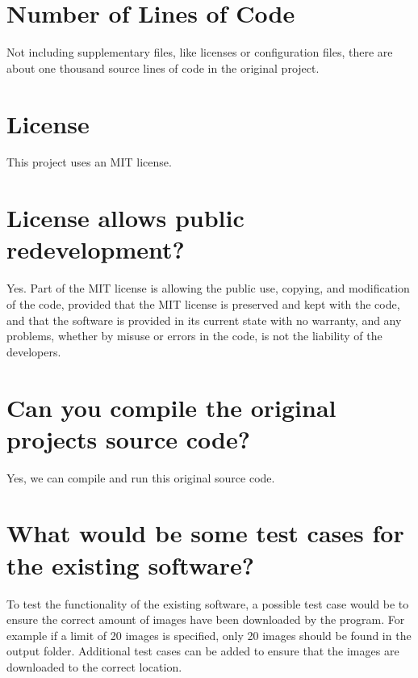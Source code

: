 \documentclass[12pt]{article}
\begin{document}
\section* {Number of Lines of Code}

Not including supplementary files, like licenses or configuration files, there are about one thousand source lines of code in the original project.

\section* {License}

This project uses an MIT license.

\section* {License allows public redevelopment?}

Yes. Part of the MIT license is allowing the public use, copying, and modification of the code, provided that the MIT license is preserved and kept with the code, and that the software is provided in its current state with no warranty, and any problems, whether by misuse or errors in the code, is not the liability of the developers.

\section* {Can you compile the original projects source code?}

Yes, we can compile and run this original source code.

\section* {What would be some test cases for the existing software?}

To test the functionality of the existing software, a possible test case would be to ensure the correct amount of images have been downloaded by the program. For example if a limit of 20 images is specified, only 20 images should be found in the output folder. Additional test cases can be added to ensure that the images are downloaded to the correct location.
\end{document}

